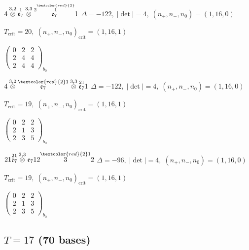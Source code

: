 \documentclass[10pt]{article}
\begin{document}
\smallskip

$4\overset{3,2}{\otimes}\overset{1}{\mathfrak{e}_7}\overset{3,3}{\otimes}\overset{2\overset{\textcolor{red}{2}}{1}}{\mathfrak{e}_7}1$ \quad $\Delta=-122,\; |\det|=4,\; (n_+,n_-,n_0)=(1,16,0)$

\hspace{1em}$T_{\text{crit}}=20,\; (n_+,n_-,n_0)_{\text{crit}}=(1,16,1)$

\hspace{2em}$\left(\begin{smallmatrix}0 & 2 & 2 \\ 2 & 4 & 4 \\ 2 & 4 & 4\end{smallmatrix}\right)_{\!b_0}$

$4\overset{3,2}{\otimes}\overset{\textcolor{red}{2}1}{\mathfrak{e}_7}\overset{3,3}{\otimes}\overset{21}{\mathfrak{e}_7}1$ \quad $\Delta=-122,\; |\det|=4,\; (n_+,n_-,n_0)=(1,16,0)$

\hspace{1em}$T_{\text{crit}}=19,\; (n_+,n_-,n_0)_{\text{crit}}=(1,16,1)$

\hspace{2em}$\left(\begin{smallmatrix}0 & 2 & 2 \\ 2 & 1 & 3 \\ 2 & 3 & 5\end{smallmatrix}\right)_{\!b_0}$

\smallskip

$21\overset{21}{\mathfrak{e}_7}\overset{3,3}{\otimes}\mathfrak{e}_712\overset{\textcolor{red}{2}1}{3}2$ \quad $\Delta=-96,\; |\det|=4,\; (n_+,n_-,n_0)=(1,16,0)$

\hspace{1em}$T_{\text{crit}}=19,\; (n_+,n_-,n_0)_{\text{crit}}=(1,16,1)$

\hspace{2em}$\left(\begin{smallmatrix}0 & 2 & 2 \\ 2 & 1 & 3 \\ 2 & 3 & 5\end{smallmatrix}\right)_{\!b_0}$


\subsection*{$T = 17$ \quad (70 bases)}
\smallskip
\end{document}
